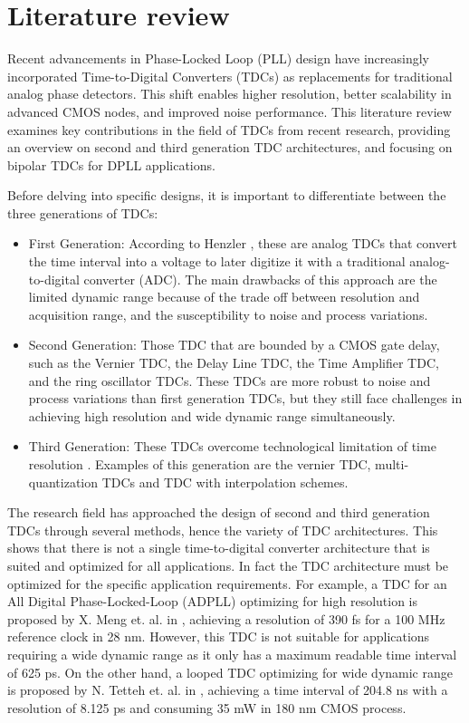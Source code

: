 
\chapter{Literature review}
Recent advancements in Phase-Locked Loop (PLL) design have increasingly incorporated Time-to-Digital Converters (TDCs) as replacements for traditional analog phase detectors. This shift enables higher resolution,
better scalability in advanced CMOS nodes, and improved noise performance. This literature review examines key contributions in the field of TDCs from recent research, providing an overview on second
and third generation TDC architectures, and focusing on bipolar TDCs for DPLL applications.

Before delving into specific designs, it is important to differentiate between the three generations of TDCs:
\begin{itemize}
    \item First Generation: According to Henzler \cite{Henzler2010}, these are analog TDCs that convert the time interval into a voltage to later digitize it with a traditional analog-to-digital converter (ADC). 
    The main drawbacks of this approach are the limited dynamic range because of the trade off between resolution and acquisition range, and the susceptibility to noise and process variations.
    \item Second Generation: Those TDC that are bounded by a CMOS gate delay, such as the Vernier TDC, the Delay Line TDC, the Time Amplifier TDC, and the ring oscillator TDCs. These TDCs are more robust to noise
    and process variations than first generation TDCs, but they still face challenges in achieving high resolution and wide dynamic range simultaneously.
    \item Third Generation: These TDCs overcome technological limitation of time resolution \cite{EL-Hadbi_TDC_review_2019}. Examples of this generation are the vernier TDC, multi-quantization TDCs and TDC with 
    interpolation schemes.
\end{itemize} 

The research field has approached the design of second and third generation TDCs through several methods, hence the variety of TDC architectures. This shows that there is not a single time-to-digital converter
architecture that is suited and optimized for all applications. In fact the TDC architecture must be optimized for the specific application requirements. For example, a TDC for an All Digital Phase-Locked-Loop (ADPLL)
optimizing for high resolution is proposed by X. Meng et. al. in \cite{Meng2025}, achieving a resolution of 390 fs for a 100 MHz reference clock in 28 nm. However, this TDC is not suitable for applications
requiring a wide dynamic range as it only has a maximum readable time interval of 625 ps. On the other hand, a looped TDC optimizing for wide dynamic range is proposed by N. Tetteh et. al. in \cite{Narku-Tetteh2014},
achieving a time interval of 204.8 ns with a resolution of 8.125 ps and consuming 35 mW in 180 nm CMOS process.

